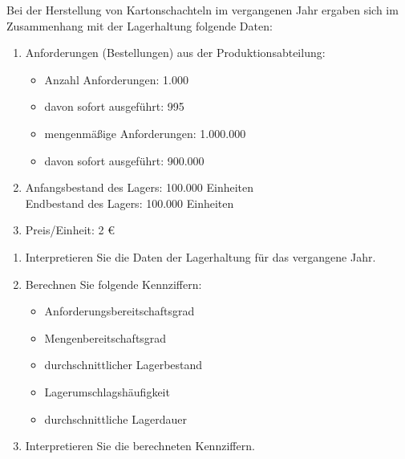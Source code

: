 Bei der Herstellung von Kartonschachteln im vergangenen Jahr ergaben sich im Zusammenhang mit der Lagerhaltung folgende Daten:

\begin{enumerate}
    \item Anforderungen (Bestellungen) aus der Produktionsabteilung:
    \begin{itemize}
        \item Anzahl Anforderungen: 1.000
        \item davon sofort ausgeführt: 995
        \item mengenmäßige Anforderungen: 1.000.000
        \item davon sofort ausgeführt: 900.000
    \end{itemize}
    
    \item Anfangsbestand des Lagers: 100.000 Einheiten\\
          Endbestand des Lagers: 100.000 Einheiten
    
    \item Preis/Einheit: 2 €
\end{enumerate}

\begin{enumerate}[label=\alph*)]
    \item Interpretieren Sie die Daten der Lagerhaltung für das vergangene Jahr.
    \item Berechnen Sie folgende Kennziffern:
    \begin{itemize}
        \item Anforderungsbereitschaftsgrad
        \item Mengenbereitschaftsgrad
        \item durchschnittlicher Lagerbestand
        \item Lagerumschlagshäufigkeit
        \item durchschnittliche Lagerdauer
    \end{itemize}
    \item Interpretieren Sie die berechneten Kennziffern.
\end{enumerate}

